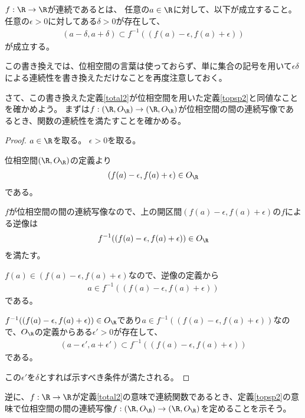 \documentclass[uplatex]{jsarticle}
\begin{document}
\begin{dfn}[関数の連続性]\label{total2}
  $f:\R\to\R$が連続であるとは、
  任意の$a\in\R$に対して、以下が成立すること。
  任意の$\epsilon>0$に対してある$\delta>0$が存在して、
  \begin{align*}
    (a-\delta,a+\delta)\subset f^{-1}((f(a)-\epsilon,f(a)+\epsilon))
  \end{align*}
  が成立する。
\end{dfn}

この書き換えでは、位相空間の言葉は使っておらず、単に集合の記号を用いて$\epsilon\delta$による連続性を書き換えただけなことを再度注意しておく。

さて、この書き換えた定義\ref{total2}が位相空間を用いた定義\ref{topsp2}と同値なことを確かめよう。
まずは$f:(\R,O_\R)\to(\R,O_\R)$が位相空間の間の連続写像であるとき、関数の連続性を満たすことを確かめる。

\begin{proof}
  $a\in\R$を取る。
  $\epsilon>0$を取る。
  
  位相空間$(\R,O_\R)$の定義より
  \begin{align*}
    (f(a)-\epsilon,f(a)+\epsilon)\in O_\R
  \end{align*}
  である。
  
  $f$が位相空間の間の連続写像なので、上の開区間$(f(a)-\epsilon,f(a)+\epsilon)$の$f$による逆像は
  \begin{align*}
    f^{-1}((f(a)-\epsilon,f(a)+\epsilon))\in O_\R
  \end{align*}
  を満たす。
  
  $f(a)\in(f(a)-\epsilon,f(a)+\epsilon)$なので、逆像の定義から
  \begin{align*}
    a\in f^{-1}((f(a)-\epsilon,f(a)+\epsilon))
  \end{align*}
  である。
  
  $f^{-1}((f(a)-\epsilon,f(a)+\epsilon))\in O_\R$であり$a\in f^{-1}((f(a)-\epsilon,f(a)+\epsilon))$なので、$O_\R$の定義からある$\epsilon'>0$が存在して、
  \begin{align*}
    (a-\epsilon',a+\epsilon')\subset f^{-1}((f(a)-\epsilon,f(a)+\epsilon))
  \end{align*}
  である。

  この$\epsilon'$を$\delta$とすれば示すべき条件が満たされる。
\end{proof}

逆に、$f:\R\to\R$が定義\ref{total2}の意味で連続関数であるとき、定義\ref{topsp2}の意味で位相空間の間の連続写像$f:(\R,O_\R)\to(\R,O_\R)$を定めることを示そう。
\end{document}
